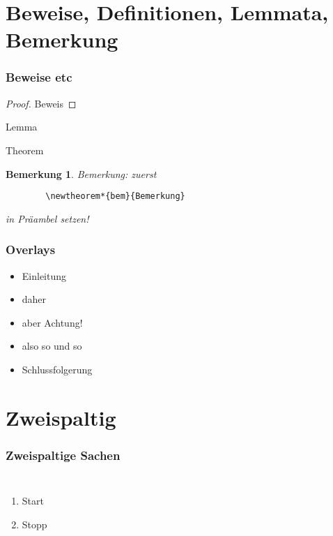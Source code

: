 \documentclass[11pt]{beamer}
\newtheorem*{bem}{Bemerkung} %
\begin{document}
\section{Beweise, Definitionen, Lemmata, Bemerkung}
\begin{frame}[fragile]
	\frametitle{Beweise etc}

    \begin{proof}
        Beweis
    \end{proof}
    
    \begin{lemma}
        Lemma
    \end{lemma}
    
    \begin{theorem}
        Theorem
    \end{theorem}
    
     \begin{bem}
	Bemerkung: zuerst 
	  \begin{verbatim}
	    \newtheorem*{bem}{Bemerkung}
	  \end{verbatim}
	  in Präambel setzen! 
     \end{bem}
\end{frame}

\begin{frame}
	\frametitle{Overlays}
   \begin{itemize}
        \item Einleitung
        \item<2-> daher
        \item<alert@3> aber Achtung!
        \item<3-> also so und so
        \item<4-> Schlussfolgerung
   \end{itemize}
\end{frame}


\section{Zweispaltig}
\begin{frame}
	\frametitle{Zweispaltige Sachen}
    \begin{columns}
                 \begin{enumerate}
                 \item Start
                 \item Stopp
                 \end{enumerate}
    \end{columns}
\end{frame}
\end{document}
